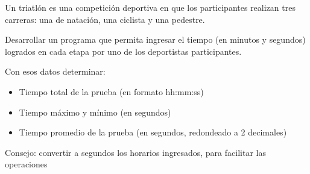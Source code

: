 Un triatlón es una competición deportiva en que los participantes realizan tres carreras: una de natación, una ciclista y una pedestre.

Desarrollar un programa que permita ingresar el tiempo (en minutos y segundos) logrados en cada etapa por uno de los deportistas participantes.

Con esos datos determinar:

\begin{itemize}
	\item Tiempo total de la prueba (en formato hh:mm:ss)
	\item Tiempo máximo y mínimo (en segundos)
	\item Tiempo promedio de la prueba (en segundos, redondeado a 2 decimales)
\end{itemize}

Consejo: convertir a segundos los horarios ingresados, para facilitar las operaciones